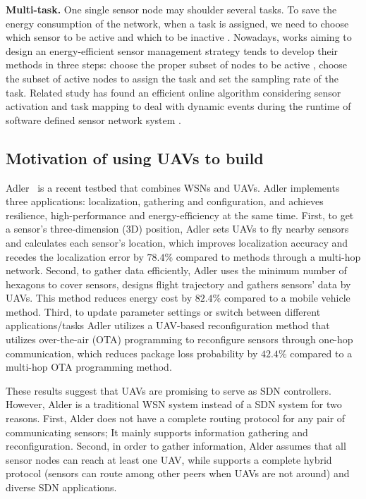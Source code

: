 \textbf{Multi-task.}
One single sensor node may shoulder several tasks. To save the energy consumption of the network, 
when a task is assigned, we need to choose which sensor to be active and which to be inactive \cite{Georges2011Energy}. 
Nowadays, works aiming to design an energy-efficient sensor management strategy
tends to develop their methods in three steps: choose the proper subset of nodes to be active \cite{Aghdasi2009High}, choose the subset of active nodes to assign the task and set the sampling rate of the task. Related study has found an efficient online 
algorithm considering sensor activation and task mapping to deal with dynamic events during the 
runtime of software defined sensor network system \cite{Zeng2015}.

\subsection{Motivation of using  UAVs to build {\sdn}}

Adler~\cite{Alder} is a recent testbed that combines WSNs and UAVs.
Adler implements three applications: localization, gathering and configuration, 
and achieves resilience, high-performance and energy-efficiency at the same time.
First, to get a sensor's three-dimension (3D) position, 
Adler sets UAVs to fly nearby sensors and calculates each sensor's 
location, which improves localization accuracy and recedes the 
localization error by $78.4\%$ compared to methods through a multi-hop network. 
Second, to gather data efficiently, 
Adler uses the minimum number of hexagons to cover 
sensors, designs flight trajectory and gathers sensors' data by UAVs. 
This method reduces energy cost by $82.4\%$ compared to a mobile vehicle method. 
Third, to update parameter settings or switch between different applications/tasks
Adler utilizes a UAV-based reconfiguration method that utilizes over-the-air (OTA) 
programming to reconfigure sensors through one-hop communication, 
which reduces package loss probability by $42.4\%$ compared to a multi-hop OTA programming method.

These results suggest that UAVs are promising to serve as SDN controllers.
However, Alder is a traditional WSN system instead of a SDN system for two reasons.
First, Alder does not have a  complete routing protocol for any pair of communicating sensors;
It mainly supports information gathering and reconfiguration.
Second, in order to gather information, Alder assumes that all sensor nodes can
reach at least one UAV, while {\sdn} supports a complete hybrid protocol
(sensors can route among other peers when UAVs are not around)
 and diverse SDN applications. 







